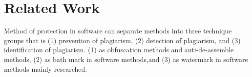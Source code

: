 \documentclass[conference]{IEEEtran}
\begin{document}
%





\section{Related Work}
Method of protection in software can separate methods into three technique groups that is (1) prevention of plagiarism, (2) detection of plagiarism, and (3) identification of plagiarism.\cite{collberg09surreptitious}
(1) as obfuscation methods and anti-de-assemble methods\cite{tyma00patent,monden97ieice}, (2) as bath mark in software methods\cite{tamada05ieice},and (3) as watermark in software methods mainly researched\cite{collberg99popl}.
\end{document}
